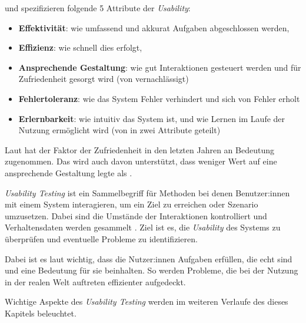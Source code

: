 \textcite{quesenberyDimensionsUsability2003} und \textcite{nielsenUsabilityEngineering1994}
spezifizieren folgende 5 Attribute der \textit{Usability}:
\begin{itemize}
  \item \textbf{Effektivität}: wie umfassend und akkurat Aufgaben abgeschlossen werden,
  \item \textbf{Effizienz}: wie schnell dies erfolgt,
  \item \textbf{Ansprechende Gestaltung}: wie gut Interaktionen gesteuert werden und für
    Zufriedenheit gesorgt wird (von \textcite{nielsenUsabilityEngineering1994} vernachlässigt)
  \item \textbf{Fehlertoleranz}: wie das System Fehler verhindert und sich von Fehler erholt
  \item \textbf{Erlernbarkeit}: wie intuitiv das System ist, und wie Lernen im Laufe der Nutzung
    ermöglicht wird (von \textcite{nielsenUsabilityEngineering1994} in zwei Attribute geteilt)
\end{itemize}
Laut \textcite{barnumUsabilityTesting2021} hat der Faktor der Zufriedenheit in den letzten Jahren an
Bedeutung zugenommen. Das wird auch davon unterstützt, dass
\textcite{nielsenUsabilityEngineering1994} weniger Wert auf eine ansprechende Gestaltung legte als
\textcite{quesenberyDimensionsUsability2003}.

\newpage

\textit{Usability Testing} ist ein Sammelbegriff für Methoden bei denen Benutzer:innen mit einem
System interagieren, um ein Ziel zu erreichen oder Szenario umzusetzen. Dabei sind die Umstände der
Interaktionen kontrolliert und Verhaltensdaten werden gesammelt
\parencite{wichanskyUsabilityTesting2000}. Ziel ist es, die \textit{Usability} des Systems zu
überprüfen und eventuelle Probleme zu identifizieren.

Dabei ist es laut \textcite{barnumUsabilityTesting2021} wichtig, dass die Nutzer:innen Aufgaben
erfüllen, die echt sind und eine Bedeutung für sie beinhalten. So werden Probleme, die bei der
Nutzung in der realen Welt auftreten effizienter aufgedeckt.

Wichtige Aspekte des \textit{Usability Testing} werden im weiteren Verlaufe des dieses Kapitels
beleuchtet.
